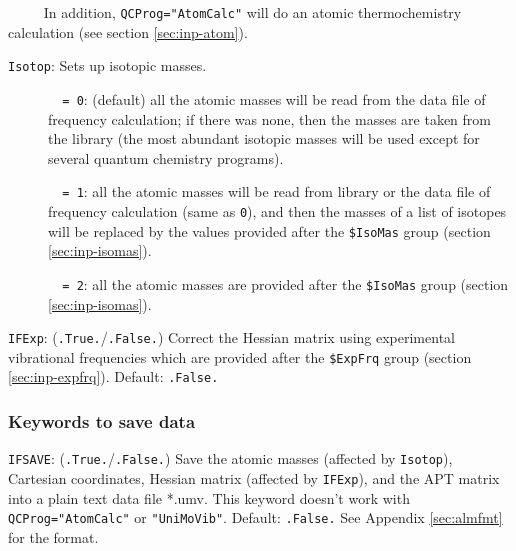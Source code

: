\documentclass[12pt,english]{extarticle}
\begin{document}
\verb|     |In addition, \verb|QCProg="AtomCalc"| will do an atomic thermochemistry calculation (see section \ref{sec:inp-atom}).

\bigskip{}\bigskip{}
\verb|Isotop|: Sets up isotopic masses.
\begin{description}
\item[ ]\verb|  = 0|: (default) all the atomic masses will be read from the data file of frequency calculation;
if there was none, then the masses are taken from the library (the most abundant isotopic masses will be used except for several quantum chemistry programs).
\item[ ]\verb|  = 1|: all the atomic masses will be read from library or the data file of
frequency calculation (same as \verb|0|), and then the masses of a list of isotopes will be
replaced by the values provided after the \verb|$IsoMas| group (section \ref{sec:inp-isomas}).
\item[ ]\verb|  = 2|: all the atomic masses are provided after the \verb|$IsoMas| group (section \ref{sec:inp-isomas}).
\end{description}

\bigskip{}\bigskip{}
\verb|IFExp|: (\verb|.True.|/\verb|.False.|) Correct the Hessian matrix using
experimental vibrational frequencies which are provided after the \verb|$ExpFrq| group (section \ref{sec:inp-expfrq}).
Default: \verb|.False.|

\subsubsection{Keywords to save data} \label{subsec:inp-qcdata-save}

\bigskip{}\bigskip{}
\verb|IFSAVE|: (\verb|.True.|/\verb|.False.|) Save the atomic masses (affected by
\verb|Isotop|), Cartesian coordinates, Hessian matrix (affected by
\verb|IFExp|), and the APT matrix into a plain text data file *.umv. This keyword
doesn't work with \verb|QCProg="AtomCalc"| or \verb|"UniMoVib"|. Default: \verb|.False.| See Appendix \ref{sec:almfmt} for the format.
\end{document}
